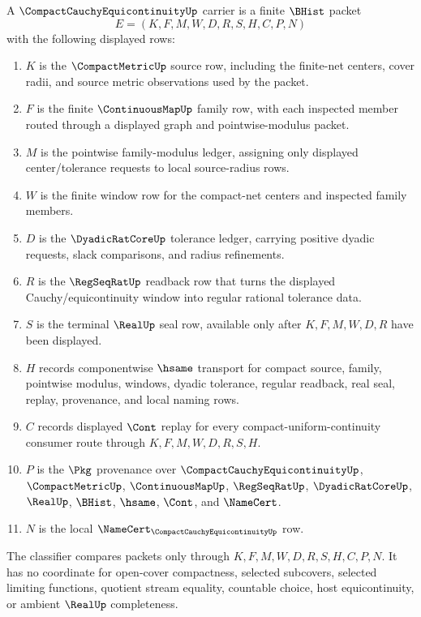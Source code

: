\begin{definition}
\label{def:compact-cauchy-equicontinuity-carrier}
A $\CompactCauchyEquicontinuityUp$ carrier is a finite $\BHist$ packet
$$
E=(K,F,M,W,D,R,S,H,C,P,N)
$$
with the following displayed rows:
\begin{enumerate}
\item $K$ is the $\CompactMetricUp$ source row, including the finite-net centers, cover radii, and source metric observations used by the packet.
\item $F$ is the finite $\ContinuousMapUp$ family row, with each inspected member routed through a displayed graph and pointwise-modulus packet.
\item $M$ is the pointwise family-modulus ledger, assigning only displayed center/tolerance requests to local source-radius rows.
\item $W$ is the finite window row for the compact-net centers and inspected family members.
\item $D$ is the $\DyadicRatCoreUp$ tolerance ledger, carrying positive dyadic requests, slack comparisons, and radius refinements.
\item $R$ is the $\RegSeqRatUp$ readback row that turns the displayed Cauchy/equicontinuity window into regular rational tolerance data.
\item $S$ is the terminal $\RealUp$ seal row, available only after $K,F,M,W,D,R$ have been displayed.
\item $H$ records componentwise $\hsame$ transport for compact source, family, pointwise modulus, windows, dyadic tolerance, regular readback, real seal, replay, provenance, and local naming rows.
\item $C$ records displayed $\Cont$ replay for every compact-uniform-continuity consumer route through $K,F,M,W,D,R,S,H$.
\item $P$ is the $\Pkg$ provenance over $\CompactCauchyEquicontinuityUp$, $\CompactMetricUp$, $\ContinuousMapUp$, $\RegSeqRatUp$, $\DyadicRatCoreUp$, $\RealUp$, $\BHist$, $\hsame$, $\Cont$, and $\NameCert$.
\item $N$ is the local $\NameCert_{\CompactCauchyEquicontinuityUp}$ row.
\end{enumerate}
The classifier compares packets only through $K,F,M,W,D,R,S,H,C,P,N$. It has no coordinate for open-cover compactness, selected subcovers, selected limiting functions, quotient stream equality, countable choice, host equicontinuity, or ambient $\RealUp$ completeness.
\end{definition}

